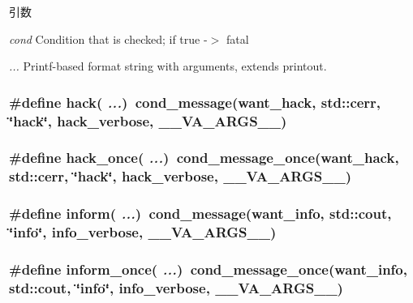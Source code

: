 \begin{DoxyParams}{引数}
\item[{\em cond}]Condition that is checked; if true -\/$>$ fatal \item[{\em ...}]Printf-\/based format string with arguments, extends printout. \end{DoxyParams}
\hypertarget{base_2misc_8hh_a3ac67e8755a9cc9c3bf9e84e0f221458}{
\subsubsection[{hack}]{\setlength{\rightskip}{0pt plus 5cm}\#define hack( {\em ...})~cond\_\-message({\bf want\_\-hack}, std::cerr, \char`\"{}hack\char`\"{}, hack\_\-verbose, \_\-\_\-VA\_\-ARGS\_\-\_\-)}}
\label{base_2misc_8hh_a3ac67e8755a9cc9c3bf9e84e0f221458}
\hypertarget{base_2misc_8hh_ae2881bab26c1d2bf4a411f8b1fb7e574}{
\subsubsection[{hack\_\-once}]{\setlength{\rightskip}{0pt plus 5cm}\#define hack\_\-once( {\em ...})~cond\_\-message\_\-once({\bf want\_\-hack}, std::cerr, \char`\"{}hack\char`\"{}, hack\_\-verbose, \_\-\_\-VA\_\-ARGS\_\-\_\-)}}
\label{base_2misc_8hh_ae2881bab26c1d2bf4a411f8b1fb7e574}
\hypertarget{base_2misc_8hh_ae7d790080fa18103d7582effff570b9e}{
\subsubsection[{inform}]{\setlength{\rightskip}{0pt plus 5cm}\#define inform( {\em ...})~cond\_\-message({\bf want\_\-info}, std::cout, \char`\"{}info\char`\"{}, info\_\-verbose, \_\-\_\-VA\_\-ARGS\_\-\_\-)}}
\label{base_2misc_8hh_ae7d790080fa18103d7582effff570b9e}
\hypertarget{base_2misc_8hh_af8d79216c5f11e879df0d333f7400b12}{
\subsubsection[{inform\_\-once}]{\setlength{\rightskip}{0pt plus 5cm}\#define inform\_\-once( {\em ...})~cond\_\-message\_\-once({\bf want\_\-info}, std::cout, \char`\"{}info\char`\"{}, info\_\-verbose, \_\-\_\-VA\_\-ARGS\_\-\_\-)}}
